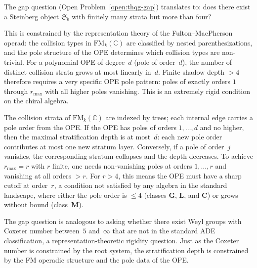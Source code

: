 \begin{proposition}
\ClaimStatusConjectured
The gap question \textup{(}Open
Problem~\ref{open:thqg-gap}\textup{)} translates to: does
there exist a Steinberg object $\mathfrak{S}_b$ with
finitely many strata but more than four?

This is constrained by the representation theory of the
Fulton--MacPherson operad: the collision types in
$\mathrm{FM}_k(\mathbb{C})$ are classified by nested
parenthesizations, and the pole structure of the OPE
determines which collision types are non-trivial. For a
polynomial OPE of degree~$d$ (pole of order~$d$), the
number of distinct collision strata grows at most linearly
in~$d$. Finite shadow depth $> 4$ therefore requires a
very specific OPE pole pattern: poles of exactly orders
$1$ through $r_{\max}$ with all higher poles vanishing.
This is an extremely rigid condition on the chiral algebra.
\end{proposition}

\begin{remark}[Evidence]
The collision strata of $\mathrm{FM}_k(\mathbb{C})$ are
indexed by trees; each internal edge carries a pole order
from the OPE. If the OPE has poles of orders
$1, \ldots, d$ and no higher, then the maximal
stratification depth is at most~$d$: each new pole order
contributes at most one new stratum layer. Conversely, if
a pole of order~$j$ vanishes, the corresponding stratum
collapses and the depth decreases. To achieve
$r_{\max} = r$ with $r$ finite, one needs non-vanishing
poles at orders $1, \ldots, r$ and vanishing at all orders
$> r$. For $r > 4$, this means the OPE must have a sharp
cutoff at order~$r$, a condition not satisfied by any
algebra in the standard landscape, where either the pole
order is $\leq 4$ (classes $\mathbf{G}$, $\mathbf{L}$,
and $\mathbf{C}$) or grows without bound (class~$\mathbf{M}$).
\end{remark}

\begin{remark}
The gap question is analogous to asking whether there exist
Weyl groups with Coxeter number between~$5$ and~$\infty$
that are not in the standard ADE classification, a
representation-theoretic rigidity question. Just as the
Coxeter number is constrained by the root system, the
stratification depth is constrained by the FM operadic
structure and the pole data of the OPE.
\end{remark}

